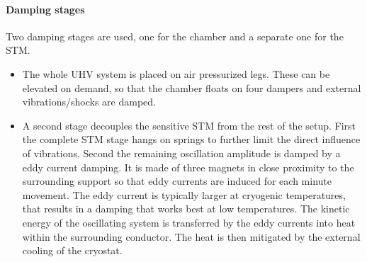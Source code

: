 \paragraph{Damping stages}
Two damping stages are used, one for the chamber and a separate one for the STM.
\begin{itemize}
	\item The whole UHV system is placed on air pressurized legs. These can be elevated on demand, so that the chamber floats on four dampers and external vibrations/shocks are damped.
	\item A second stage decouples the sensitive STM from the rest of the setup. First the complete STM stage hangs on springs to further limit the direct influence of vibrations. Second the remaining oscillation amplitude is damped by a eddy current damping. It is made of three magnets in close proximity to the surrounding support so that eddy currents are induced for each minute movement. The eddy current is typically larger at cryogenic temperatures, that results in a damping that works best at low temperatures. The kinetic energy of the oscillating system is transferred by the eddy currents into heat within the surrounding conductor. The heat is then mitigated by the external cooling of the cryostat.
\end{itemize}

